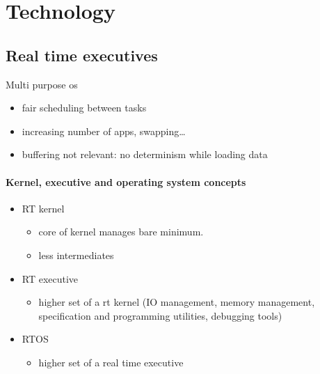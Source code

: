 \documentclass[10pt]{article}
\theoremstyle{plain}
\theoremstyle{definition}
\theoremstyle{remark}
\begin{document}
\section{Technology}

\subsection{Real time executives}
Multi purpose os
\begin{itemize}
	\item fair scheduling between tasks
	\item increasing number of apps, swapping\dots
	\item buffering not relevant: no determinism while loading data
\end{itemize}

\paragraph{Kernel, executive and operating system concepts}
\begin{itemize}
	\item RT kernel
		\begin{itemize}
			\item core of kernel manages bare minimum.
			\item less intermediates
		\end{itemize}
	\item RT executive
		\begin{itemize}
			\item higher set of a rt kernel (IO management, memory management,
				specification and programming utilities, debugging tools)
		\end{itemize}
	\item RTOS
		\begin{itemize}
			\item higher set of a real time executive
		\end{itemize}
\end{itemize}
\end{document}
